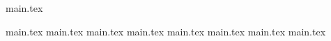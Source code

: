 \documentclass[10pt,a4paper,titlepage]{report}
\begin{document}
{main.tex}

\newpage
{main.tex}
\newpage
{main.tex}
\newpage
	{main.tex}
\newpage
{main.tex}
\newpage
{main.tex}
\newpage
{main.tex}
\newpage
{main.tex}
{main.tex}

\printbibliography
\end{document}
